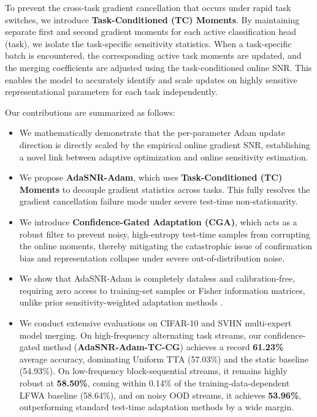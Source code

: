 \documentclass{article}
\theoremstyle{plain}
\theoremstyle{definition}
\theoremstyle{remark}
\begin{document}
To prevent the cross-task gradient cancellation that occurs under rapid task switches, we introduce \textbf{Task-Conditioned (TC) Moments}. By maintaining separate first and second gradient moments for each active classification head (task), we isolate the task-specific sensitivity statistics. When a task-specific batch is encountered, the corresponding active task moments are updated, and the merging coefficients are adjusted using the task-conditioned online SNR. This enables the model to accurately identify and scale updates on highly sensitive representational parameters for each task independently.

Our contributions are summarized as follows:
\begin{itemize}
    \item We mathematically demonstrate that the per-parameter Adam update direction is directly scaled by the empirical online gradient SNR, establishing a novel link between adaptive optimization and online sensitivity estimation.
    \item We propose \textbf{AdaSNR-Adam}, which uses \textbf{Task-Conditioned (TC) Moments} to decouple gradient statistics across tasks. This fully resolves the gradient cancellation failure mode under severe test-time non-stationarity.
    \item We introduce \textbf{Confidence-Gated Adaptation (CGA)}, which acts as a robust filter to prevent noisy, high-entropy test-time samples from corrupting the online moments, thereby mitigating the catastrophic issue of confirmation bias and representation collapse under severe out-of-distribution noise.
    \item We show that AdaSNR-Adam is completely dataless and calibration-free, requiring zero access to training-set samples or Fisher information matrices, unlike prior sensitivity-weighted adaptation methods \cite{matena22fisher}.
    \item We conduct extensive evaluations on CIFAR-10 \cite{krizhevsky09cifar} and SVHN \cite{netzer11svhn} multi-expert model merging. On high-frequency alternating task streams, our confidence-gated method (\textbf{AdaSNR-Adam-TC-CG}) achieves a record \textbf{61.23\%} average accuracy, dominating Uniform TTA (57.03\%) and the static baseline (54.93\%). On low-frequency block-sequential streams, it remains highly robust at \textbf{58.50\%}, coming within 0.14\% of the training-data-dependent LFWA baseline (58.64\%), and on noisy OOD streams, it achieves \textbf{53.96\%}, outperforming standard test-time adaptation methods by a wide margin.
\end{itemize}
\end{document}

